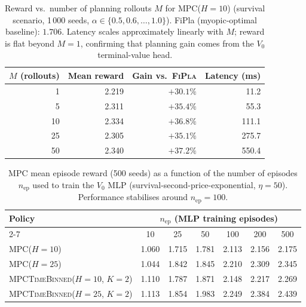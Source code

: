 \documentclass[11pt]{article}
\begin{document}
\begin{table}[H]
\centering
\caption{Reward vs.\ number of planning rollouts $M$ for \textsc{MPC}($H{=}10$)
         (survival scenario, 1\,000 seeds, $\alpha\in\{0.5,0.6,\ldots,1.0\}$).
         FiPla (myopic-optimal baseline): $1.706$.
         Latency scales approximately linearly with $M$; reward is flat beyond $M{=}1$,
         confirming that planning gain comes from the $V_0$ terminal-value head.}
\label{tab:nrollouts}
\begin{tabular}{rrrr}
\toprule
$M$ (rollouts) & Mean reward & Gain vs.\ \textsc{FiPla} & Latency (ms) \\
\midrule
 1 & 2.219 & $+30.1\%$ &  11.2 \\
\midrule
 5 & 2.311 & $+35.4\%$ &  55.3 \\
10 & 2.334 & $+36.8\%$ & 111.1 \\
25 & 2.305 & $+35.1\%$ & 275.7 \\
50 & 2.340 & $+37.2\%$ & 550.4 \\
\bottomrule
\end{tabular}
\end{table}

\begin{table}[H]
\centering
\caption{MPC mean episode reward (500 seeds) as a function of the number
         of episodes $n_\text{ep}$ used to train the $V_0$ MLP
         (survival-second-price-exponential, $\eta{=}50$).
         Performance stabilises around $n_\text{ep}{=}100$.}
\label{tab:mlp-sensitivity}
\setlength{\tabcolsep}{5pt}
\begin{tabular}{lcccccc}
\toprule
Policy & \multicolumn{6}{c}{$n_\text{ep}$ (MLP training episodes)} \\
\cmidrule(l){2-7}
 & 10 & 25 & 50 & 100 & 200 & 500 \\
\midrule
\textsc{MPC}($H{=}10$)
  & 1.060 & 1.715 & 1.781 & 2.113 & 2.156 & 2.175 \\
\textsc{MPC}($H{=}25$)
  & 1.044 & 1.842 & 1.845 & 2.210 & 2.309 & 2.345 \\
\textsc{MPCTimeBinned}($H{=}10$, $K{=}2$)
  & 1.110 & 1.787 & 1.871 & 2.148 & 2.217 & 2.269 \\
\textsc{MPCTimeBinned}($H{=}25$, $K{=}2$)
  & 1.113 & 1.854 & 1.983 & 2.249 & 2.384 & 2.439 \\
\bottomrule
\end{tabular}
\end{table}


\end{document}
